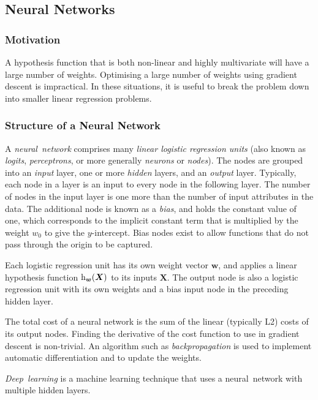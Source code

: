 \subsection{Neural Networks}

\subsubsection{Motivation}

A hypothesis function that is both non-linear and highly multivariate will have a large number of weights.
Optimising a large number of weights using gradient descent is impractical.
In these situations, it is useful to break the problem down into smaller linear regression problems.

\subsubsection{Structure of a Neural Network}

A \emph{neural~network} comprises many \emph{linear logistic regression units} (also known as \emph{logits}, \emph{perceptrons}, or more generally \emph{neurons} or \emph{nodes}).
The nodes are grouped into an \emph{input} layer, one or more \emph{hidden} layers, and an \emph{output} layer.
Typically, each node in a layer is an input to every node in the following layer.
The number of nodes in the input layer is one more than the number of input attributes in the data.
The additional node is known as a \emph{bias}, and holds the constant value of one, which corresponds to the implicit constant term that is multiplied by the weight \( w_{0} \) to give the \( y \)-intercept.
Bias nodes exist to allow functions that do not pass through the origin to be captured.

Each logistic regression unit has its own weight vector \( \boldsymbol{w} \), and applies a linear hypothesis function \( \function[_{\boldsymbol{w}}]{h}{\boldsymbol{X}} \) to its inputs \( \boldsymbol{X} \).
The output node is also a logistic regression unit with its own weights and a bias input node in the preceding hidden layer.

The total cost of a neural network is the sum of the linear (typically L2) costs of its output nodes.
Finding the derivative of the cost function to use in gradient descent is non-trivial.
An algorithm such as \emph{backpropagation} is used to implement automatic differentiation and to update the weights.

\emph{Deep~learning} is a machine learning technique that uses a neural~network with multiple hidden layers.

